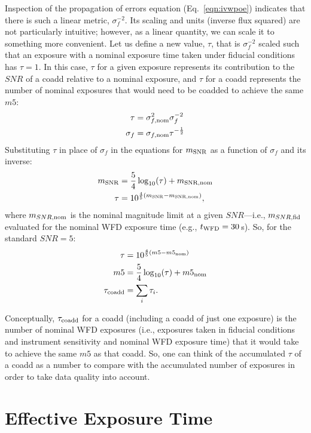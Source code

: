 \documentclass[DM,authoryear,toc]{lsstdoc}
\begin{document}
Inspection of the propagation of errors equation (Eq.~\ref{eqn:ivwpoe}) indicates that there is such a linear metric, $\sigma_f^{-2}$. Its scaling and units (inverse flux squared) are not particularly intuitive; however, as a linear quantity, we can scale it to something more convenient. Let us define a new value, $\tau$, that is $\sigma_f^{-2}$ scaled such that an exposure with a nominal exposure time taken under fiducial conditions has $\tau=1$. In this case, $\tau$ for a given exposure represents its contribution to the $SNR$ of a coadd relative to a nominal exposure, and $\tau$ for a coadd represents the number of nominal exposures that would need to be coadded to achieve the same $m5$:
\begin{align}
\tau &= \sigma_{f, {\rm nom}}^2 \sigma_f^{-2} \\
\sigma_f &= \sigma_{f, {\rm nom}} \tau^{-\frac{1}{2}}
\end{align}
Substituting $\tau$ in place of $\sigma_f$ in the equations for $m_{\rm SNR}$ as a function of $\sigma_f$ and its inverse:
\begin{align}
m_{\rm SNR} &= \frac{5}{4} \log_{10}(\tau) + m_{\rm SNR,nom} \\
\tau &= 10^{\frac{4}{5} (m_{\rm SNR} - m_{\rm SNR,nom})},
\end{align}
where $m_{SNR, {\rm nom}}$ is the nominal magnitude limit at a given $SNR$---i.e.,  $m_{SNR, {\rm fid}}$ evaluated for the nominal WFD exposure time (e.g., $t_{\rm WFD} = 30$\,s). So, for the standard $SNR = 5$:
\begin{align}
\tau  &= 10^{\frac{4}{5} (m5 - m5_{\rm nom})} \\
m5 &= \frac{5}{4} \log_{10}(\tau) + m5_{\rm nom} \\
\tau_{\rm coadd} &= \sum_i \tau_i.
\end{align}

Conceptually, $\tau_{\rm coadd}$ for a coadd (including a coadd of just one exposure) is the number of nominal WFD exposures (i.e., exposures taken in fiducial conditions and instrument sensitivity and nominal WFD exposure time) that it would take to achieve the same $m5$ as that coadd. So, one can think of the accumulated $\tau$ of a coadd as a number to compare with the accumulated number of exposures in order to take data quality into account.

\section{Effective Exposure Time}
\label{sec:teff}
\end{document}
